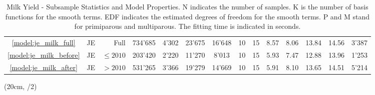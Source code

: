 \begin{landscape}
\begin{table}[H]
\begin{tabular}{c c r r r r c c c c c c c r}
            \hline
            \textcolor{blue}{\ref{model:je_milk_full}}& JE & Full & 734'685 & 4'302 & 23'675 & 16'648 & 10 & 15 & 8.57 & 8.06 & 13.84 & 14.56 & 3'387\\
            \textcolor{blue}{\ref{model:je_milk_before}}& JE & $\leq2010$ & 203'420 & 2'220 & 11'270 & 8'013 & 10 & 15 & 5.93 & 7.47 & 12.88 & 13.96 & 1'253\\
            \textcolor{blue}{\ref{model:je_milk_after}}& JE & $>2010$ & 531'265 & 3'366 & 19'279 & 14'669 & 10 & 15 & 5.91 & 8.10 & 13.65 & 14.51 & 5'214\\
            \bottomrule
        \end{tabular}
        \caption{Milk Yield - Subsample Statistics and Model Properties. N indicates the number of samples. K is the number of basis functions for the smooth terms. EDF indicates the estimated degrees of freedom for the smooth terms. P and M stand for primiparous and multiparous. The fitting time is indicated in seconds.}
        \label{table:milk_yield_subsample_stats_model_props}
    \end{table}

\begin{textblock*}{2cm}(20cm, \dimexpr\paperheight/2)
\end{textblock*}
\end{landscape}
\newpage

